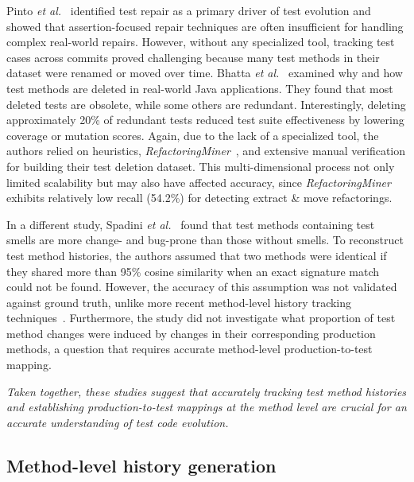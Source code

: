 Pinto \textit{et al.}~\cite{pinto2012understanding} identified test repair as a primary driver of test evolution and showed that assertion-focused repair techniques are often insufficient for handling complex real-world repairs. However, without any specialized tool, tracking test cases across commits proved challenging because many test methods in their dataset were renamed or moved over time. Bhatta \textit{et al.}~\cite{bhatta2025understanding} examined why and how test methods are deleted in real-world Java applications. They found that most deleted tests are obsolete, while some others are redundant. Interestingly, deleting approximately 20\% of redundant tests reduced test suite effectiveness by lowering coverage or mutation scores. Again, due to the lack of a specialized tool, the authors relied on heuristics, \emph{RefactoringMiner}~\cite{tsantalis2020refactoringminer}, and extensive manual verification for building their test deletion dataset. This multi-dimensional process not only limited scalability but may also have affected accuracy, since \emph{RefactoringMiner} exhibits relatively low recall (54.2\%) for detecting extract \& move refactorings.

In a different study, Spadini \textit{et al.}~\cite{Spadini:2018} found that test methods containing test smells are more change- and bug-prone than those without smells. To reconstruct test method histories, the authors assumed that two methods were identical if they shared more than 95\% cosine similarity when an exact signature match could not be found. However, the accuracy of this assumption was not validated against ground truth, unlike more recent method-level history tracking techniques~\cite{grund:2021,jodavi_accurate_2022,islam_historyfinder_2025}. Furthermore, the study did not investigate what proportion of test method changes were induced by changes in their corresponding production methods, a question that requires accurate method-level production-to-test mapping.

\emph{Taken together, these studies suggest that accurately tracking test method histories and establishing production-to-test mappings at the method level are crucial for an accurate understanding of test code evolution.}

\subsection{Method-level history generation}

